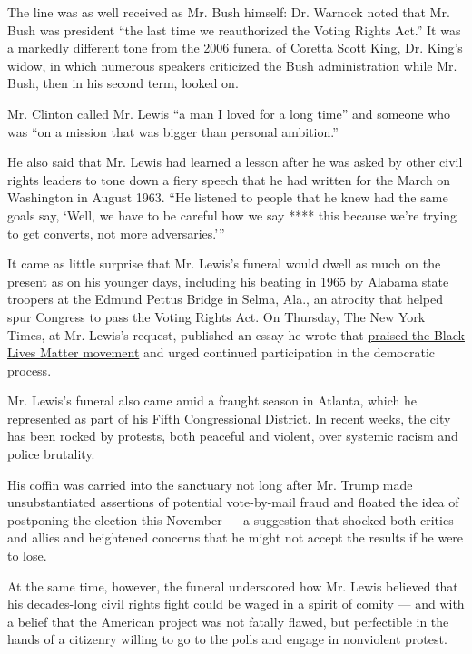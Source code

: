 The line was as well received as Mr. Bush himself: Dr. Warnock noted
that Mr. Bush was president ``the last time we reauthorized the Voting
Rights Act.'' It was a markedly different tone from the 2006 funeral of
Coretta Scott King, Dr. King's widow, in which numerous speakers
criticized the Bush administration while Mr. Bush, then in his second
term, looked on.

Mr. Clinton called Mr. Lewis ``a man I loved for a long time'' and
someone who was ``on a mission that was bigger than personal ambition.''

He also said that Mr. Lewis had learned a lesson after he was asked by
other civil rights leaders to tone down a fiery speech that he had
written for the March on Washington in August 1963. ``He listened to
people that he knew had the same goals say, `Well, we have to be careful
how we say **** this because we're trying to get converts, not more
adversaries.'''

It came as little surprise that Mr. Lewis's funeral would dwell as much
on the present as on his younger days, including his beating in 1965 by
Alabama state troopers at the Edmund Pettus Bridge in Selma, Ala., an
atrocity that helped spur Congress to pass the Voting Rights Act. On
Thursday, The New York Times, at Mr. Lewis's request, published an essay
he wrote that
\href{https://www.nytimes3xbfgragh.onion/2020/07/30/opinion/john-lewis-civil-rights-america.html}{praised
the Black Lives Matter movement} and urged continued participation in
the democratic process.

Mr. Lewis's funeral also came amid a fraught season in Atlanta, which he
represented as part of his Fifth Congressional District. In recent
weeks, the city has been rocked by protests, both peaceful and violent,
over systemic racism and police brutality.

His coffin was carried into the sanctuary not long after Mr. Trump made
unsubstantiated assertions of potential vote-by-mail fraud and floated
the idea of postponing the election this November --- a suggestion that
shocked both critics and allies and heightened concerns that he might
not accept the results if he were to lose.

At the same time, however, the funeral underscored how Mr. Lewis
believed that his decades-long civil rights fight could be waged in a
spirit of comity --- and with a belief that the American project was not
fatally flawed, but perfectible in the hands of a citizenry willing to
go to the polls and engage in nonviolent protest.

